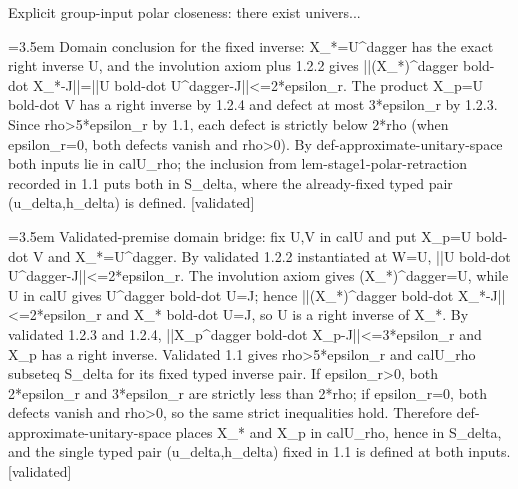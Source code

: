 \documentclass{article}
\newcommand{\step}[1]{\par\noindent\hangindent=3.5em\hangafter=1%
  \makebox[3.5em][l]{\textbf{#1.}}}
\newcommand{\steptag}[1]{\hfill{\small\textsf{[#1]}}}
\begin{document}
\begin{proofbox}{Explicit group-input polar closeness: there exist univers...}
\step{1.2.5} Domain conclusion for the fixed inverse: X\_*=U\textasciicircum{}dagger has the exact right inverse U, and the involution axiom plus 1.2.2 gives ||(X\_*)\textasciicircum{}dagger bold-dot X\_*-J||=||U bold-dot U\textasciicircum{}dagger-J||<=2*epsilon\_r. The product X\_p=U bold-dot V has a right inverse by 1.2.4 and defect at most 3*epsilon\_r by 1.2.3. Since rho>5*epsilon\_r by 1.1, each defect is strictly below 2*rho (when epsilon\_r=0, both defects vanish and rho>0). By def-approximate-unitary-space both inputs lie in calU\_rho; the inclusion from lem-stage1-polar-retraction recorded in 1.1 puts both in S\_delta, where the already-fixed typed pair (u\_delta,h\_delta) is defined. \steptag{validated} \\[6pt]
\step{1.2.5.1} Validated-premise domain bridge: fix U,V in calU and put X\_p=U bold-dot V and X\_*=U\textasciicircum{}dagger. By validated 1.2.2 instantiated at W=U, ||U bold-dot U\textasciicircum{}dagger-J||<=2*epsilon\_r. The involution axiom gives (X\_*)\textasciicircum{}dagger=U, while U in calU gives U\textasciicircum{}dagger bold-dot U=J; hence ||(X\_*)\textasciicircum{}dagger bold-dot X\_*-J||<=2*epsilon\_r and X\_* bold-dot U=J, so U is a right inverse of X\_*. By validated 1.2.3 and 1.2.4, ||X\_p\textasciicircum{}dagger bold-dot X\_p-J||<=3*epsilon\_r and X\_p has a right inverse. Validated 1.1 gives rho>5*epsilon\_r and calU\_rho subseteq S\_delta for its fixed typed inverse pair. If epsilon\_r>0, both 2*epsilon\_r and 3*epsilon\_r are strictly less than 2*rho; if epsilon\_r=0, both defects vanish and rho>0, so the same strict inequalities hold. Therefore def-approximate-unitary-space places X\_* and X\_p in calU\_rho, hence in S\_delta, and the single typed pair (u\_delta,h\_delta) fixed in 1.1 is defined at both inputs. \steptag{validated} \\[6pt]

\end{proofbox}
\end{document}
